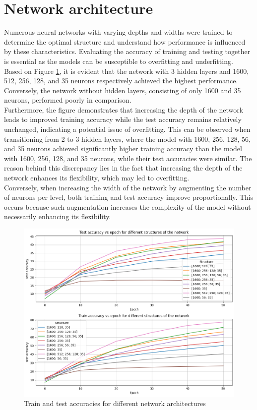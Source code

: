 \documentclass{class}
\begin{document}
\section{Network architecture}
Numerous neural networks with varying depths and widths were trained to determine the optimal structure
and understand how performance is influenced by these characteristics. Evaluating the accuracy of training and
testing together is essential as the models can be susceptible to overfitting and underfitting. \\
Based on Figure \ref{fig-3}, it is evident that the network with 3 hidden layers and 1600, 512, 256, 128, and 35 neurons
respectively achieved the highest performance. Conversely, the network without hidden layers, consisting of only 1600 and 35 neurons,
performed poorly in comparison. \\
Furthermore, the figure demonstrates that increasing the depth of the network leads to improved training accuracy
while the test accuracy remains relatively unchanged, indicating a potential issue of overfitting.
This can be observed when transitioning from 2 to 3 hidden layers, where the model with 1600, 256, 128, 56, and 35 neurons
achieved significantly higher training accuracy than the model with 1600, 256, 128, and 35 neurons,
while their test accuracies were similar. The reason behind this discrepancy lies in the fact that increasing the depth of
the network enhances its flexibility, which may led to overfitting. \\
Conversely, when increasing the width of the network by augmenting the number of neurons per level, both training and
test accuracy improve proportionally. This occurs because such augmentation increases the complexity of the model without
necessarily enhancing its flexibility.

\begin{figure}[H]
  \centering
  \includegraphics[width=.8\columnwidth]{images/diff_structures.png}
  \caption{Train and test accuracies for different network architectures}
  \label{fig-3}
\end{figure}
\end{document}
